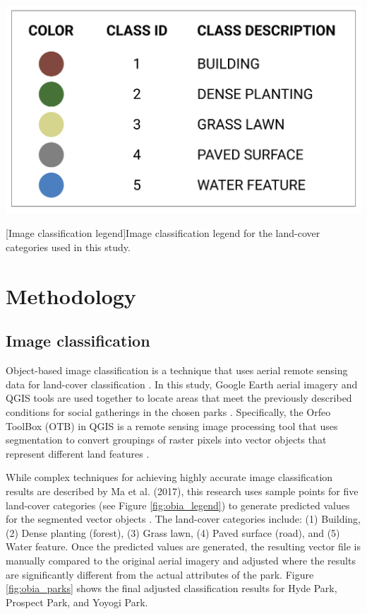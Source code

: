 \begin{multicols}{2}
\vspace{5pt}
\begin{minipage}{0.45\textwidth}
    \centering
    \includegraphics[width=\linewidth]{images/gatherings/OBIA_legend.png}\par{}[Image classification legend]{Image classification legend for the land-cover categories used in this study.}
    \label{fig:obia_legend}
\end{minipage}
\vspace{5pt}

\section{Methodology}
\subsection{Image classification}
Object-based image classification is a technique that uses aerial remote sensing data for land-cover classification \cite{ma_review_2017}. In this study, Google Earth aerial imagery and QGIS tools are used together to locate areas that meet the previously described conditions for social gatherings in the chosen parks \cite{noauthor_google_nodate}. Specifically, the Orfeo ToolBox (OTB) in QGIS is a remote sensing image processing tool that uses segmentation to convert groupings of raster pixels into vector objects that represent different land features \cite{neteler_compiling_2015}. 

While complex techniques for achieving highly accurate image classification results are described by Ma et al. (2017), this research uses sample points for five land-cover categories (see Figure \ref{fig:obia_legend}) to generate predicted values for the segmented vector objects \cite{ma_review_2017}. The land-cover categories include: (1) Building, (2) Dense planting (forest), (3) Grass lawn, (4) Paved surface (road), and (5) Water feature. Once the predicted values are generated, the resulting vector file is manually compared to the original aerial imagery and adjusted where the results are significantly different from the actual attributes of the park. Figure \ref{fig:obia_parks} shows the final adjusted classification results for Hyde Park, Prospect Park, and Yoyogi Park. 


\end{multicols}
